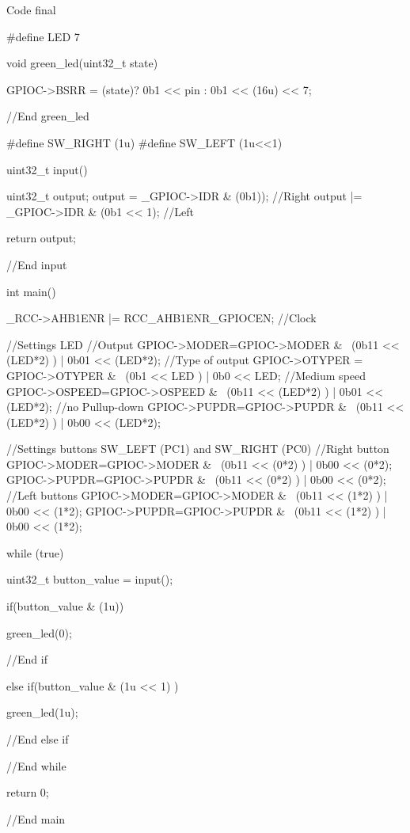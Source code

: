 \begin{Cpp}{Code final}

  #define LED 7
  
  void green_led(uint32_t state){

    GPIOC->BSRR = (state)? 0b1 << pin : 0b1 << (16u) << 7;

  }//End green_led

  #define SW_RIGHT (1u)
  #define SW_LEFT (1u<<1)

  uint32_t input(){

    uint32_t output;
    output = _GPIOC->IDR & (0b1)); //Right
    output |= _GPIOC->IDR & (0b1 << 1); //Left
  
    return output;

  }//End input

  int main(){
  
    _RCC->AHB1ENR |= RCC_AHB1ENR_GPIOCEN; //Clock

    //Settings LED
    //Output
    GPIOC->MODER=GPIOC->MODER & ~(0b11 << (LED*2) ) | 0b01 << (LED*2); 
    //Type of output
    GPIOC->OTYPER = GPIOC->OTYPER & ~(0b1 << LED ) | 0b0 << LED; 
    //Medium speed
    GPIOC->OSPEED=GPIOC->OSPEED & ~(0b11 << (LED*2) ) | 0b01 << (LED*2);
    //no Pullup-down
    GPIOC->PUPDR=GPIOC->PUPDR & ~(0b11 << (LED*2) ) | 0b00 << (LED*2);


    //Settings buttons SW_LEFT (PC1) and SW_RIGHT (PC0)
    //Right button
    GPIOC->MODER=GPIOC->MODER & ~(0b11 << (0*2) ) | 0b00 << (0*2); 
    GPIOC->PUPDR=GPIOC->PUPDR & ~(0b11 << (0*2) ) | 0b00 << (0*2);
    //Left buttons
    GPIOC->MODER=GPIOC->MODER & ~(0b11 << (1*2) ) | 0b00 << (1*2); 
    GPIOC->PUPDR=GPIOC->PUPDR & ~(0b11 << (1*2) ) | 0b00 << (1*2);
  
    while (true){
  
      uint32_t button_value = input();
  
      if(button_value & (1u)){
  
        green_led(0);
  
      }//End if
  
      else if(button_value & (1u << 1) ){
      
        green_led(1u);

      }//End else if

    }//End while

  return 0;
  }//End main

\end{Cpp}


